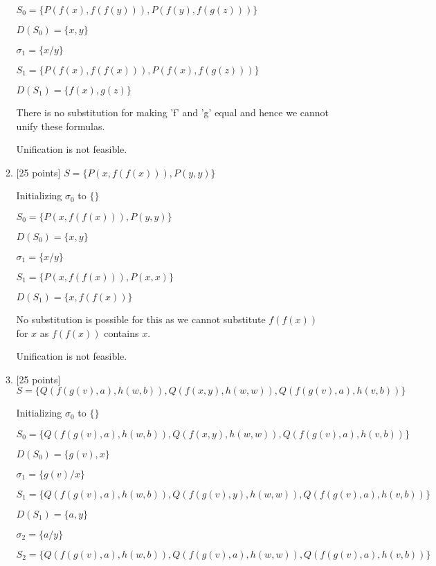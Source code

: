 \documentclass{article}
\begin{document}
\begin{enumerate}
\begin{enumerate}
\begin{answer}
    	$S_0 = \{ P(f(x),f(f(y))), P(f(y),f(g(z))) \}$
    	
    	$D(S_0) = \{ x, y\}$
    	\bigskip
    	
    	$\sigma_1 = \{x/y\}$
    	
    	$S_1 = \{ P(f(x),f(f(x))), P(f(x),f(g(z))) \}$
    	
    	$D(S_1) = \{ f(x), g(z)\}$
    	
    	There is no substitution for making 'f' and 'g' equal and hence we cannot
    	unify these formulas.
    	\bigskip
    	
    	Unification is not feasible.
    \end{answer}

  \item {[25 points]}
    $S = \{ P(x,f(f(x))), P(y,y) \}$

	\begin{answer}
		Initializing $\sigma_0$ to $\{\}$
		
		$S_0 = \{ P(x,f(f(x))), P(y,y) \}$
		
		$D(S_0) = \{x, y\}$
		\bigskip
		
		$\sigma_1 = \{x/y\}$
		
		$S_1 = \{ P(x,f(f(x))), P(x,x) \}$
		
		$D(S_1) = \{x, f(f(x))\}$
		
		No substitution is possible for this as we cannot substitute $f(f(x))$ for $x$
		as $f(f(x))$ contains $x$.
		\bigskip
		
		Unification is not feasible.
		
	\end{answer}
  \item {[25 points]}
    $S = \{ Q(f(g(v),a),h(w,b)), Q(f(x,y),h(w,w)), Q(f(g(v),a),h(v,b)) \}$
    
    \begin{answer}
    	Initializing $\sigma_0$ to $\{\}$
    	
    	$S_0 = \{ Q(f(g(v),a),h(w,b)), Q(f(x,y),h(w,w)), Q(f(g(v),a),h(v,b)) \}$
    	
    	$D(S_0) = \{ g(v), x\}$
    	\bigskip
    	
    	$\sigma_1 = \{ g(v)/x \}$
    	
    	$S_1 = \{ Q(f(g(v),a),h(w,b)), Q(f(g(v),y),h(w,w)), Q(f(g(v),a),h(v,b)) \}$
    	
    	$D(S_1) = \{ a, y\}$
    	\bigskip
    	
    	$\sigma_2 = \{ a/y \}$
    	
    	$S_2 = \{ Q(f(g(v),a),h(w,b)), Q(f(g(v),a),h(w,w)), Q(f(g(v),a),h(v,b)) \}$
    	

\end{answer}
\end{enumerate}
\end{enumerate}
\end{document}

